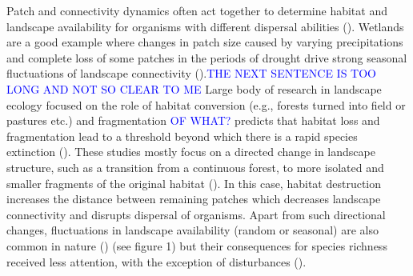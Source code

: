 \documentclass[12pt]{article}
\newcommand{\GM}[1]{\textcolor{Blue}{#1}}
\begin{document}
Patch and connectivity dynamics often act together to determine habitat and landscape availability for organisms with different dispersal abilities (\cite{LauranceEtAl1997, Hanski1999, DebinskiHolt2000, KattwinkelEtAl2009, MetzgerEtAl2009}). Wetlands are a good example where changes in patch size caused by varying precipitations and complete loss of some patches in the periods of drought drive strong seasonal fluctuations of landscape connectivity (\cite{RoshierEtAl2008, RuizEtAl2014}).\GM{THE NEXT SENTENCE IS TOO LONG AND NOT SO CLEAR TO ME} Large body of research in landscape ecology focused on the role of habitat conversion (e.g.,
forests turned into field or pastures etc.) and fragmentation \GM{OF WHAT?} predicts that habitat loss and fragmentation lead to a threshold beyond which there is a rapid species extinction (\cite{fahrig2002,ovaskainenhanski2003,rybickihanski2013}). These
studies mostly focus on a directed change in landscape structure, such as a transition from a continuous forest, to more isolated and smaller fragments of the original habitat (\cite{LauranceEtAl1997, MetzgerEtAl2009}). In this case, habitat destruction increases the distance between remaining patches which decreases landscape connectivity and disrupts dispersal of organisms. Apart from such directional changes, fluctuations in landscape availability (random or seasonal) are also common in nature (\cite{Sprugel1991, RuizEtAl2014}) (see figure 1) but their consequences for species richness received less attention, with the exception of disturbances (\cite{Sousa1984, SuppErnest2014}).
\end{document}
